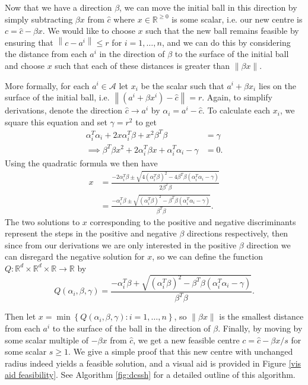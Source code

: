 \documentclass[11pt,twoside]{report}
\newcommand{\A}{\mathcal{A}} %
\newcommand{\norm}[1]{\left\lVert#1\right\rVert} %
\theoremstyle{definition}
\numberwithin{theorem}{section}
\numberwithin{definition}{section}
\numberwithin{lemma}{section}
\numberwithin{proposition}{section}
\numberwithin{equation}{section}
\numberwithin{figure}{section}
\begin{document}
Now that we have a direction $\beta$, we can move the initial ball in this direction by simply subtracting $\beta x$ from $\hat{c}$ where $x\in\mathbb{R}^{\geq0}$ is some scalar, i.e. our new centre is $c=\hat{c}-\beta x$. We would like to choose $x$ such that the new ball remains feasible by ensuring that $\norm{c-a^i}\leq r$ for $i=1,\ldots,n$, and we can do this by considering the distance from each $a^i$ in the direction of $\beta$ to the surface of the initial ball and choose $x$ such that each of these distances is greater than $\norm{\beta x}$.

More formally, for each $a^i\in\A$ let $x_i$ be the scalar such that $a^i+\beta x_i$ lies on the surface of the initial ball, i.e. $\norm{(a^i+\beta x^i)-\hat{c}}=r$. Again, to simplify derivations, denote the direction $\hat{c}\to a^i$ by $\alpha_i=a^i-\hat{c}$. To calculate each $x_i$, we square this equation and set $\gamma=r^2$ to get
\begin{align*}
    \alpha_i^T\alpha_i + 2x\alpha_i^T\beta + x^2\beta^T\beta &= \gamma \\
    \implies \beta^T\beta x^2 + 2\alpha_i^T\beta x + \alpha_i^T\alpha_i - \gamma &= 0.
\end{align*}
Using the quadratic formula we then have
\begin{align*}
    x &= \frac{-2\alpha_i^T\beta \pm \sqrt{4\left(\alpha_i^T\beta\right)^2 - 4\beta^T \beta\left(\alpha_i^T\alpha_i-\gamma\right)}}{2\beta^T\beta} \\[4pt]
    &= \frac{-\alpha_i^T\beta \pm \sqrt{\left(\alpha_i^T\beta\right)^2 - \beta^T \beta\left(\alpha_i^T\alpha_i-\gamma\right)}}{\beta^T\beta}.
\end{align*}
The two solutions to $x$ corresponding to the positive and negative discriminants represent the steps in the positive and negative $\beta$ directions respectively, then since from our derivations we are only interested in the positive $\beta$ direction we can disregard the negative solution for $x$, so we can define the function $Q:\mathbb{R}^d\times\mathbb{R}^d\times\mathbb{R}\to\mathbb{R}$ by
\begin{equation*}
    Q(\alpha_i,\beta,\gamma) = \frac{-\alpha_i^T\beta + \sqrt{\left(\alpha_i^T\beta\right)^2 - \beta^T \beta\left(\alpha_i^T\alpha_i-\gamma\right)}}{\beta^T\beta}.
\end{equation*}


Then let $x=\min\left\{Q(\alpha_i, \beta, \gamma):i=1,\ldots,n\right\}$, so $\norm{\beta x}$ is the smallest distance from each $a^i$ to the surface of the ball in the direction of $\beta$. Finally, by moving by some scalar multiple of $-\beta x$ from $\hat{c}$, we get a new feasible centre $c=\hat{c}-\beta x/s$ for some scalar $s\geq1$. We give a simple proof that this new centre with unchanged radius indeed yields a feasible solution, and a visual aid is provided in Figure \ref{vis aid feasibility}. See Algorithm \ref{fig:dcssh} for a detailed outline of this algorithm.
\end{document}
